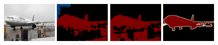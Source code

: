 \begin{figure}[t]
  \centering
  
  
  \vspace{-0.5em}
 
  \hspace{4em}
  \hspace{4em}
  \hspace{2em}
  \vspace{-0.05em} 
  {\includegraphics[width=0.24\textwidth]{figures/experiments/pascal/0000.jpg}}
  {\includegraphics[width=0.24\textwidth]{figures/experiments/pascal/ft/0000.png}}
  {\includegraphics[width=0.24\textwidth]{figures/experiments/pascal/highres+ge/0000.png}}
  {\includegraphics[width=0.24\textwidth]{figures/experiments/pascal/gt/2007_000033.png}}
  

\end{figure}
